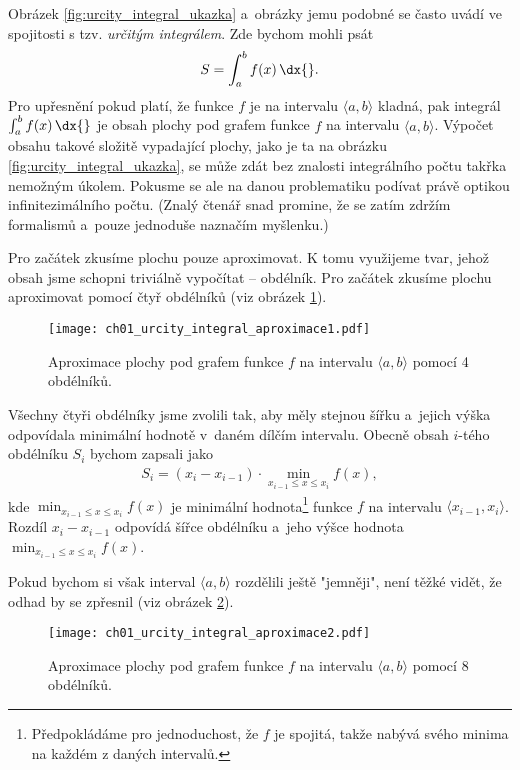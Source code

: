 Obrázek \ref{fig:urcity_integral_ukazka} a~obrázky jemu podobné se často uvádí ve spojitosti s tzv. \emph{určitým integrálem}. Zde bychom mohli psát
\begin{align*}
S=\int_{a}^{b}{f(x)\,\dx{}}.
\end{align*}
Pro upřesnění pokud platí, že funkce $f$ je na intervalu $\langle a,b \rangle$ kladná, pak integrál $\int_a^b{f(x)\,\dx{}}$ je obsah plochy pod grafem funkce $f$ na intervalu $\langle a,b \rangle$. Výpočet obsahu takové složitě vypadající plochy, jako je ta na obrázku \ref{fig:urcity_integral_ukazka}, se může zdát bez znalosti integrálního počtu takřka nemožným úkolem. Pokusme se ale na danou problematiku podívat právě optikou infinitezimálního počtu. (Znalý čtenář snad promine, že se zatím zdržím formalismů a~pouze jednoduše naznačím myšlenku.)\par
Pro začátek zkusíme plochu pouze aproximovat. K tomu využijeme tvar, jehož obsah jsme schopni triviálně vypočítat -- obdélník. Pro začátek zkusíme plochu aproximovat pomocí čtyř obdélníků (viz obrázek \ref{fig:urcity_integral_aproximace1}).
\begin{figure}[H]
	\centering
	\texttt{[image: ch01\_urcity\_integral\_aproximace1.pdf]}
	\caption{Aproximace plochy pod grafem funkce $f$ na intervalu $\langle a,b \rangle$ pomocí 4 obdélníků.}
	\label{fig:urcity_integral_aproximace1}
\end{figure}
Všechny čtyři obdélníky jsme zvolili tak, aby měly stejnou šířku a~jejich výška odpovídala minimální hodnotě v~daném dílčím intervalu. Obecně obsah $i$-tého obdélníku $S_i$ bychom zapsali jako
\begin{align*}
S_i= (x_i-x_{i-1}) \cdot \min\limits_{x_{i-1} \leq x \leq x_i}{f(x)},
\end{align*}
kde $\min_{x_{i-1} \leq x \leq x_i}{f(x)}$ je minimální hodnota\footnote{Předpokládáme pro jednoduchost, že $f$ je spojitá, takže nabývá svého minima na každém z daných intervalů.} funkce $f$ na intervalu $\langle x_{i-1},x_i \rangle$. Rozdíl $x_i-x_{i-1}$ odpovídá šířce obdélníku a~jeho výšce hodnota $\min_{x_{i-1} \leq x \leq x_i}{f(x)}$.\par
Pokud bychom si však interval $\langle a,b \rangle$ rozdělili ještě "jemněji", není těžké vidět, že odhad by se zpřesnil (viz obrázek \ref{fig:urcity_integral_aproximace2}).
\begin{figure}[H]
	\centering	\texttt{[image: ch01\_urcity\_integral\_aproximace2.pdf]}
	\caption{Aproximace plochy pod grafem funkce $f$ na intervalu $\langle a,b \rangle$ pomocí 8 obdélníků.}
	\label{fig:urcity_integral_aproximace2}
\end{figure}
